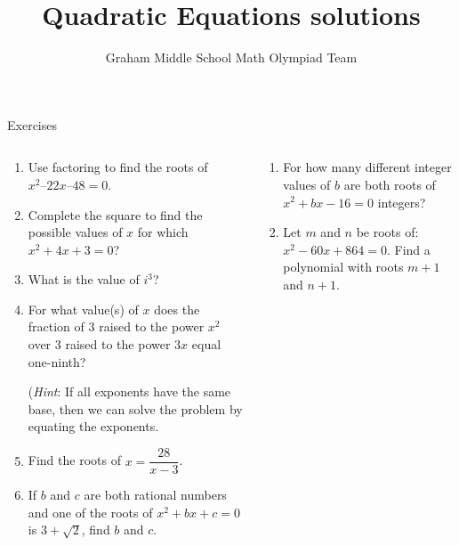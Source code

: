 \documentclass[9pt,aspectratio=169,handout]{beamer}
\title{Quadratic Equations solutions}
\subtitle[Graham Middle School]{Graham Middle School Math Olympiad Team}
\begin{document}
\maketitle

\begin{frame}{Exercises}
  \begin{columns}[T]
    \begin{column}{0.5\textwidth}
      \begin{enumerate}
        \item Use factoring to find the roots of $x^2 – 22x – 48 = 0$.
        \item Complete the square to find the possible values of $x$ for which $x^2 + 4x + 3 = 0$?
        \item What is the value of $i^3$?
        \item For what value(s) of $x$ does the fraction of $3$ raised to the power $x^2$ over $3$ raised to the power $3x$ equal one-ninth?  
        
        (\emph{Hint}: If all exponents have the same base, then we can solve the problem by equating the exponents.
        \item Find the roots of $x = \dfrac{28}{x - 3}$.
        \item If $b$ and $c$ are both rational numbers and one of the roots of $x^2 + bx + c = 0$ is $3 + \sqrt{2}$, find $b$ and $c$.
        \seti
      \end{enumerate}
    \end{column}
    \begin{column}{0.5\textwidth}
      \begin{enumerate}
        \conti
        \item For how many different integer values of $b$ are both roots of $x^2 + bx - 16 = 0$ integers?
        \item Let $m$ and $n$ be roots of: $x^2 − 60x + 864 = 0$.  Find a polynomial with roots $m + 1$ and $n + 1$.
      \end{enumerate}
    \end{column}
  \end{columns}
\end{frame}
\end{document}
